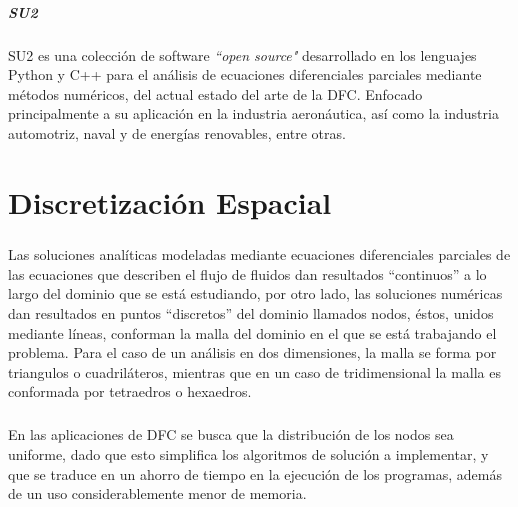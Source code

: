 \documentclass[letterpaper, openright, 12pt]{book}
\begin{document}
    \paragraph*{SU2}
    \paragraph*{}
    SU2 es una colección de software \textit{``open source"} desarrollado en
    los lenguajes Python y C++ para el análisis de ecuaciones diferenciales
    parciales mediante métodos numéricos, del actual estado del arte de la
    DFC\@. Enfocado principalmente a su aplicación en la industria aeronáutica,
    así como la industria automotriz, naval y de energías renovables, entre
    otras.\cite{SU2}

%
%
%
%
%

%
%
%
%
\chapter{Discretización Espacial} \label{chap:discretizacion-espacial}
    \paragraph*{}
    Las soluciones analíticas modeladas mediante ecuaciones diferenciales
    parciales de las ecuaciones que describen el flujo de fluidos dan resultados
    ``continuos'' a lo largo del dominio que se está estudiando, por otro lado,
    las soluciones numéricas  dan resultados en puntos ``discretos'' del dominio
    llamados nodos, éstos, unidos mediante líneas, conforman la malla del
    dominio en el que se está trabajando el problema. Para el caso de un
    análisis en dos dimensiones, la malla se forma por triangulos o
    cuadriláteros, mientras que en un caso de tridimensional la malla es
    conformada por tetraedros o hexaedros.

    \paragraph*{}
    En las aplicaciones de DFC se busca que la distribución de los nodos sea
    uniforme, dado que esto simplifica los algoritmos de solución a implementar,
    y que se traduce en un ahorro de tiempo en la ejecución de los programas,
    además de un uso considerablemente menor de memoria.
\end{document}
